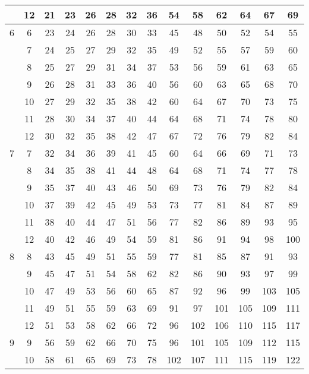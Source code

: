 \begin{center}
\begin{tabular}[t]{|c|c|*{6}{c}|*{6}{c}|}
     & 12 &  21 &  23 &  26 &  28 &  32 &  36 &  54 &  58 &  62 &  64 &  67 &  69 \\
  \hline
   6 &  6 &  23 &  24 &  26 &  28 &  30 &  33 &  45 &  48 &  50 &  52 &  54 &  55 \\
     &  7 &  24 &  25 &  27 &  29 &  32 &  35 &  49 &  52 &  55 &  57 &  59 &  60 \\
     &  8 &  25 &  27 &  29 &  31 &  34 &  37 &  53 &  56 &  59 &  61 &  63 &  65 \\
     &  9 &  26 &  28 &  31 &  33 &  36 &  40 &  56 &  60 &  63 &  65 &  68 &  70 \\
     & 10 &  27 &  29 &  32 &  35 &  38 &  42 &  60 &  64 &  67 &  70 &  73 &  75 \\
     & 11 &  28 &  30 &  34 &  37 &  40 &  44 &  64 &  68 &  71 &  74 &  78 &  80 \\
     & 12 &  30 &  32 &  35 &  38 &  42 &  47 &  67 &  72 &  76 &  79 &  82 &  84 \\
  \hline
   7 &  7 &  32 &  34 &  36 &  39 &  41 &  45 &  60 &  64 &  66 &  69 &  71 &  73 \\
     &  8 &  34 &  35 &  38 &  41 &  44 &  48 &  64 &  68 &  71 &  74 &  77 &  78 \\
     &  9 &  35 &  37 &  40 &  43 &  46 &  50 &  69 &  73 &  76 &  79 &  82 &  84 \\
     & 10 &  37 &  39 &  42 &  45 &  49 &  53 &  73 &  77 &  81 &  84 &  87 &  89 \\
     & 11 &  38 &  40 &  44 &  47 &  51 &  56 &  77 &  82 &  86 &  89 &  93 &  95 \\
     & 12 &  40 &  42 &  46 &  49 &  54 &  59 &  81 &  86 &  91 &  94 &  98 & 100 \\
  \hline
   8 &  8 &  43 &  45 &  49 &  51 &  55 &  59 &  77 &  81 &  85 &  87 &  91 &  93 \\
     &  9 &  45 &  47 &  51 &  54 &  58 &  62 &  82 &  86 &  90 &  93 &  97 &  99 \\
     & 10 &  47 &  49 &  53 &  56 &  60 &  65 &  87 &  92 &  96 &  99 & 103 & 105 \\
     & 11 &  49 &  51 &  55 &  59 &  63 &  69 &  91 &  97 & 101 & 105 & 109 & 111 \\
     & 12 &  51 &  53 &  58 &  62 &  66 &  72 &  96 & 102 & 106 & 110 & 115 & 117 \\
  \hline
   9 &  9 &  56 &  59 &  62 &  66 &  70 &  75 &  96 & 101 & 105 & 109 & 112 & 115 \\
     & 10 &  58 &  61 &  65 &  69 &  73 &  78 & 102 & 107 & 111 & 115 & 119 & 122 \\

\end{tabular}
\end{center}
